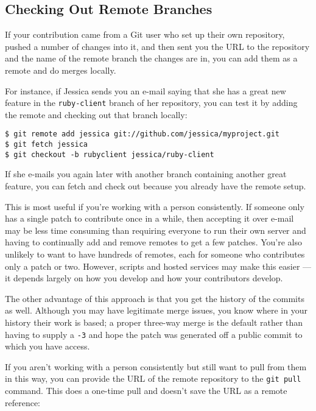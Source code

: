 \documentclass[a4paper]{book}
\begin{document}
\subsection{Checking Out Remote Branches}

If your contribution came from a Git user who set up their own repository, pushed a number of changes into it, and then sent you the URL to the repository and the name of the remote branch the changes are in, you can add them as a remote and do merges locally.

For instance, if Jessica sends you an e-mail saying that she has a great new feature in the \texttt{ruby-client} branch of her repository, you can test it by adding the remote and checking out that branch locally:

\begin{shaded}\begin{verbatim}
$ git remote add jessica git://github.com/jessica/myproject.git
$ git fetch jessica
$ git checkout -b rubyclient jessica/ruby-client
\end{verbatim}\end{shaded}

If she e-mails you again later with another branch containing another great feature, you can fetch and check out because you already have the remote setup.

This is most useful if you're working with a person consistently. If someone only has a single patch to contribute once in a while, then accepting it over e-mail may be less time consuming than requiring everyone to run their own server and having to continually add and remove remotes to get a few patches. You're also unlikely to want to have hundreds of remotes, each for someone who contributes only a patch or two. However, scripts and hosted services may make this easier --- it depends largely on how you develop and how your contributors develop.

The other advantage of this approach is that you get the history of the commits as well. Although you may have legitimate merge issues, you know where in your history their work is based; a proper three-way merge is the default rather than having to supply a \texttt{-3} and hope the patch was generated off a public commit to which you have access.

If you aren't working with a person consistently but still want to pull from them in this way, you can provide the URL of the remote repository to the \texttt{git pull} command. This does a one-time pull and doesn't save the URL as a remote reference:
\end{document}
